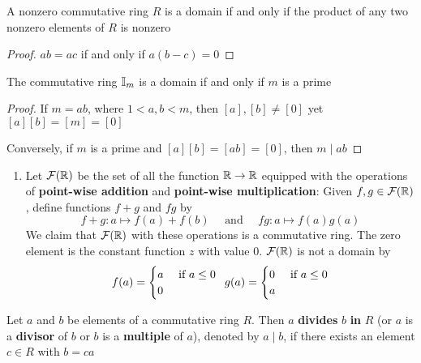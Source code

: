 \documentclass[11pt]{article}
\begin{document}
\begin{proposition}[]
A nonzero commutative ring \(R\) is a domain if and only if the product of
any two nonzero elements of \(R\) is nonzero
\end{proposition}
\begin{proof}
\(ab=ac\) if and only if \(a(b-c)=0\)
\end{proof}

\begin{proposition}[]
\label{prop3.6}
The commutative ring \(\mathbb{I}_m\) is a domain if and only if \(m\) is a prime
\end{proposition}
\begin{proof}
If \(m=ab\), where \(1<a,b<m\), then \([a],[b]\neq[0]\) yet
\([a][b]=[m]=[0]\)

Conversely, if \(m\) is a prime and \([a][b]=[ab]=[0]\), then \(m\mid ab\)
\end{proof}

\begin{examplle}[]
\begin{enumerate}
\item Let \(\mathcal{F}(\mathbb{R})\) be the set of all the function \(\mathbb{R}\to \mathbb{R}\) equipped
with the operations of \textbf{point-wise addition} and \textbf{point-wise multiplication}:
Given \(f,g\in\mathcal{F}(\mathbb{R})\), define functions \(f+g\) and \(fg\) by
\begin{equation*}
f+g:a\mapsto f(a)+f(b)\quad\text{ and }\quad fg:a\mapsto f(a)g(a)
\end{equation*}
We claim that \(\mathcal{F}(\mathbb{R})\) with these operations is a commutative ring.
The zero element is the constant function \(z\) with value 0.
\(\mathcal{F}(\mathbb{R})\) is not a domain by
\begin{equation*}
f(a)=
\begin{cases}
a&\text{ if }a\le 0\\
0\\
\end{cases}\enspace g(a)=
\begin{cases}
0&\text{ if }a\le 0\\
a
\end{cases}
\end{equation*}
\end{enumerate}
\end{examplle}

\begin{definition}[]
Let \(a\) and \(b\) be elements of a commutative ring \(R\). Then \(a\) \textbf{divides}
\(b\) \textbf{in} \(R\) (or \(a\) is a \textbf{divisor} of \(b\) or \(b\) is a \textbf{multiple} of \(a\)),
denoted by \(a\mid b\), if there exists an element \(c\in R\) with \(b=ca\)
\end{definition}
\end{document}
